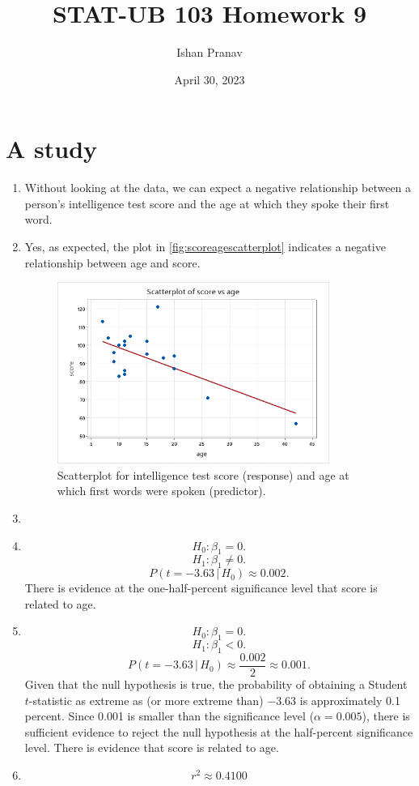\documentclass[12pt]{article}
\title{STAT-UB 103 Homework 9}
\author{Ishan Pranav}
\date{April 30, 2023}
\begin{document}
\maketitle
\section{A study}
\begin{enumerate}
\item Without looking at the data, we can expect a negative relationship between a person's intelligence test score and the age at which they spoke their first word.
\item Yes, as expected, the plot in \autoref{fig:scoreagescatterplot} indicates a negative relationship between age and score.
\begin{figure}[h]
\begin{center}
\includegraphics[width=3.5in]{src/images/score-age-scatterplot.png}
\end{center}
\caption{Scatterplot for intelligence test score (response) and age at which first words were spoken (predictor).\label{fig:scoreagescatterplot}}
\end{figure}
\item
\item
\[H_0:\beta_1=0.\]
\[H_1:\beta_1\neq 0.\]
\[P(t=-3.63\,|\,H_0)\approx0.002.\]
There is evidence at the one-half-percent significance level that score is related to age.
\item
\[H_0:\beta_1=0.\]
\[H_1:\beta_1<0.\]
\[P(t=-3.63\,|\,H_0)\approx\frac{0.002}{2}\approx 0.001.\]
Given that the null hypothesis is true, the probability of obtaining a Student $t$-statistic as extreme as (or more extreme than) $-3.63$ is approximately 0.1 percent. Since 0.001 is smaller than the significance level ($\alpha=0.005$), there is sufficient evidence to reject the null hypothesis at the half-percent significance level. There is evidence that score is related to age.
\item
\[r^2\approx 0.4100\]


\end{enumerate}
\end{document}
